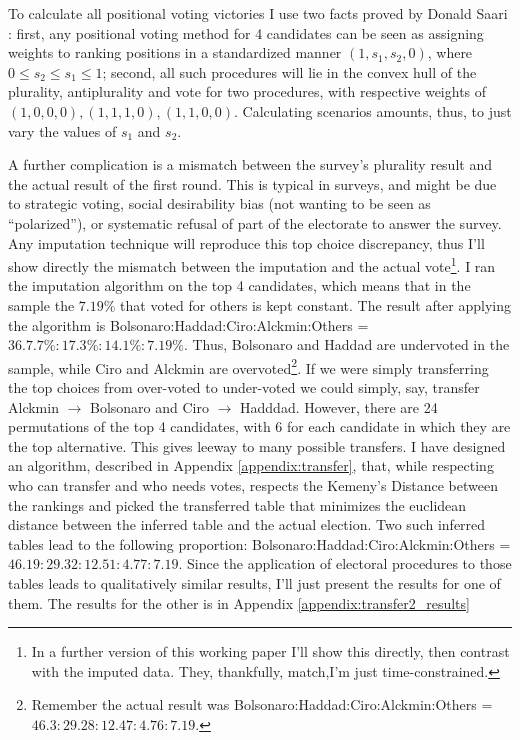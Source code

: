 \documentclass[hidelinks,11pt]{article}
\begin{document}
To calculate all positional voting victories I use two facts proved by Donald Saari \parencite{saari2012geometry, saari2001chaotic}: first, any positional voting method for 4 candidates can be seen as assigning weights to ranking positions in a standardized manner \((1,s_{1},s_{2},0)\), where \(0 \leq s_{2} \leq s_{1} \leq 1\); second, all such procedures will lie in the convex hull of the plurality, antiplurality and vote for two procedures, with respective weights of \((1,0,0,0), (1,1,1,0), (1,1,0,0)\). Calculating scenarios amounts, thus, to just vary the values of \(s_{1}\) and \(s_{2}\).

A further complication is a mismatch between the survey's
plurality result and the actual result of the first round. This is typical in
surveys, and might be due to strategic voting, social desirability bias (not
wanting to be seen as ``polarized''), or systematic refusal of part of the electorate
to answer the survey. Any imputation technique will reproduce this top choice discrepancy, thus I'll show directly the mismatch between the
imputation and the actual vote\footnote{In a further version of this working
  paper I'll show this directly, then contrast with the imputed data. They,
  thankfully, match,I'm just time-constrained.}. I ran the imputation algorithm
on the top 4 candidates, which means that in the sample the \(7.19\%\) that
voted for others is kept constant. The result after applying the algorithm is
Bolsonaro:Haddad:Ciro:Alckmin:Others = \(36.7.7\% : 17.3\% : 14.1\% :7.19\% \).
Thus, Bolsonaro and Haddad are undervoted in the sample, while Ciro and Alckmin
are overvoted\footnote{Remember the actual result was
  Bolsonaro:Haddad:Ciro:Alckmin:Others = \(46.3:29.28:12.47:4.76:7.19 \).}. If
we were simply transferring the top choices from over-voted to under-voted we
could simply, say, transfer Alckmin \(\rightarrow\) Bolsonaro and Ciro \(\rightarrow\) Hadddad.
However, there are 24 permutations of the top 4 candidates, with 6 for each
candidate in which they are the top alternative. This gives leeway to many
possible transfers. I have designed an algorithm, described in Appendix
\ref{appendix:transfer}, that, while respecting who can transfer and who needs
votes, respects the Kemeny's Distance between the rankings and picked the
transferred table that minimizes the euclidean distance between the inferred
table and the actual election. Two such inferred tables lead to the following
proportion: Bolsonaro:Haddad:Ciro:Alckmin:Others =
\(46.19:29.32:12.51:4.77:7.19 \). Since the application of electoral procedures
to those tables leads to qualitatively similar results, I'll just present the
results for one of them. The results for the other is in Appendix
\ref{appendix:transfer2_results}
\end{document}
